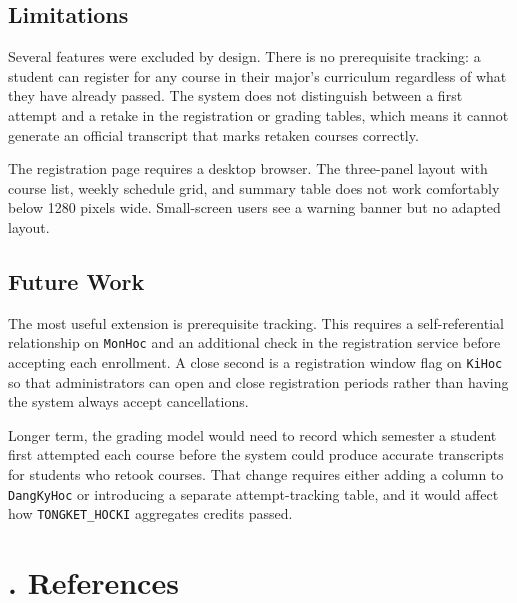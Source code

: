 \documentclass[12pt,a4paper]{report}
\begin{document}
\section{Limitations}

Several features were excluded by design. There is no prerequisite tracking: a student can register for any course in their major's curriculum regardless of what they have already passed. The system does not distinguish between a first attempt and a retake in the registration or grading tables, which means it cannot generate an official transcript that marks retaken courses correctly.

The registration page requires a desktop browser. The three-panel layout with course list, weekly schedule grid, and summary table does not work comfortably below 1280 pixels wide. Small-screen users see a warning banner but no adapted layout.

\section{Future Work}

The most useful extension is prerequisite tracking. This requires a self-referential relationship on \texttt{MonHoc} and an additional check in the registration service before accepting each enrollment. A close second is a registration window flag on \texttt{KiHoc} so that administrators can open and close registration periods rather than having the system always accept cancellations.

Longer term, the grading model would need to record which semester a student first attempted each course before the system could produce accurate transcripts for students who retook courses. That change requires either adding a column to \texttt{DangKyHoc} or introducing a separate attempt-tracking table, and it would affect how \texttt{TONGKET\_HOCKI} aggregates credits passed.


\chapter{. References}


\begingroup
    \renewcommand{\chapter}[2]{} 
    
\end{document}
